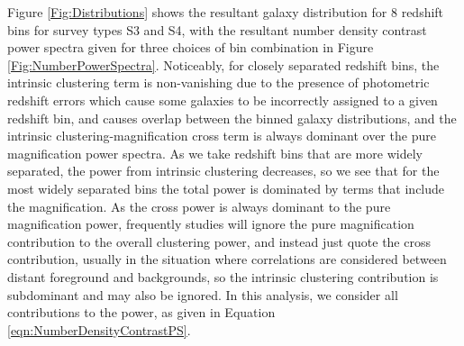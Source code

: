 \documentclass[useAMS,usenatbib,times,letter,amssymb]{mn2e}
\def\be{\begin{equation}}
\def\ee{\end{equation}}
\begin{document}
Figure \ref{Fig:Distributions} shows the resultant galaxy distribution for 8 redshift bins for survey types S3 and S4, with the resultant number density contrast power spectra given for three choices of bin combination in Figure \ref{Fig:NumberPowerSpectra}. Noticeably, for closely separated redshift bins, the intrinsic clustering term is non-vanishing due to the presence of photometric redshift errors which cause some galaxies to be incorrectly assigned to a given redshift bin, and causes overlap between the binned galaxy distributions, and the intrinsic clustering-magnification cross term is always dominant over the pure magnification power spectra. As we take redshift bins that are more widely separated, the power from intrinsic clustering decreases, so we see that for the most widely separated bins the total power is dominated by terms that include the magnification. As the cross power is always dominant to the pure magnification power, frequently studies will ignore the pure magnification contribution to the overall clustering power, and instead just quote the cross contribution, usually in the situation where correlations are considered between distant foreground and backgrounds, so the intrinsic clustering contribution is subdominant and may also be ignored. In this analysis, we consider all contributions to the power, as given in Equation \ref{eqn:NumberDensityContrastPS}.

\end{document}
